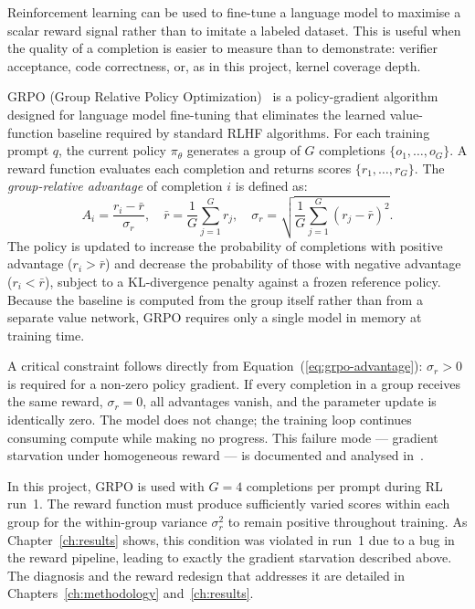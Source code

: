 Reinforcement learning can be used to fine-tune a language model to maximise a
scalar reward signal rather than to imitate a labeled dataset.
This is useful when the quality of a completion is easier to measure than to
demonstrate: verifier acceptance, code correctness, or, as in this project,
kernel coverage depth.

GRPO (Group Relative Policy Optimization)~\cite{deepseekmath} is a
policy-gradient algorithm designed for language model fine-tuning that eliminates
the learned value-function baseline required by standard RLHF algorithms.
For each training prompt $q$, the current policy $\pi_\theta$ generates a group
of $G$ completions $\{o_1, \ldots, o_G\}$.
A reward function evaluates each completion and returns scores
$\{r_1, \ldots, r_G\}$.
The \emph{group-relative advantage} of completion $i$ is defined as:
\begin{equation}
  A_i = \frac{r_i - \bar{r}}{\sigma_r}, \quad
  \bar{r} = \frac{1}{G}\sum_{j=1}^G r_j, \quad
  \sigma_r = \sqrt{\frac{1}{G}\sum_{j=1}^G (r_j - \bar{r})^2}.
  \label{eq:grpo-advantage}
\end{equation}
The policy is updated to increase the probability of completions with positive
advantage ($r_i > \bar{r}$) and decrease the probability of those with negative
advantage ($r_i < \bar{r}$), subject to a KL-divergence penalty against a frozen
reference policy.
Because the baseline is computed from the group itself rather than from a separate
value network, GRPO requires only a single model in memory at training time.

A critical constraint follows directly from Equation~(\ref{eq:grpo-advantage}):
$\sigma_r > 0$ is required for a non-zero policy gradient.
If every completion in a group receives the same reward, $\sigma_r = 0$, all
advantages vanish, and the parameter update is identically zero.
The model does not change; the training loop continues consuming compute while
making no progress.
This failure mode --- gradient starvation under homogeneous reward --- is
documented and analysed in~\cite{grpo-starvation}.

In this project, GRPO is used with $G = 4$ completions per prompt during RL
run~1.
The reward function must produce sufficiently varied scores within each group for
the within-group variance $\sigma_r^2$ to remain positive throughout training.
As Chapter~\ref{ch:results} shows, this condition was violated in run~1 due to a
bug in the reward pipeline, leading to exactly the gradient starvation described
above.
The diagnosis and the reward redesign that addresses it are detailed in
Chapters~\ref{ch:methodology} and~\ref{ch:results}.

